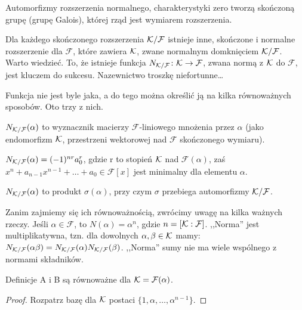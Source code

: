 Automorfizmy rozszerzenia normalnego, charakterystyki zero tworzą skończoną grupę (grupę Galois), której rząd jest wymiarem rozszerzenia.

Dla każdego skończonego rozszerzenia $\mathcal K/\mathcal F$ istnieje inne, skończone i normalne rozszerzenie dla $\mathcal F$, które zawiera $\mathcal K$, zwane {normalnym domknięciem} $\mathcal K/\mathcal F$.
Warto wiedzieć.
To, że istnieje funkcja  $N_{\mathcal K/\mathcal F} \colon \mathcal K \to \mathcal F$, zwana normą z $\mathcal K$ do $\mathcal F$, jest kluczem do sukcesu.
Nazewnictwo troszkę niefortunne\dots

Funkcja nie jest byle jaka, a do tego można określić ją na kilka równoważnych sposobów. Oto trzy z nich.

\begin{definicja}
	$N_{\mathcal K/ \mathcal F}(\alpha)$ to wyznacznik macierzy $\mathcal F$-liniowego mnożenia przez $\alpha$ (jako endomorfizm $\mathcal K$, przestrzeni wektorowej nad $\mathcal F$ skończonego wymiaru).
\end{definicja}

\begin{definicja}
	$N_{\mathcal K/\mathcal F}(\alpha) = (-1)^{nr} a_0^r$, gdzie r to stopień $\mathcal K$ nad $\mathcal F(\alpha)$, zaś $x^n + a_{n-1}x^{n-1} + \dots  + a_0 \in \mathcal F[x]$ jest minimalny dla elementu $\alpha$.
\end{definicja}

\begin{definicja} $N_{\mathcal K/\mathcal F}(\alpha)$ to produkt $\sigma(\alpha)$, przy czym $\sigma$ przebiega automorfizmy $\mathcal K / \mathcal F$.
\end{definicja}

Zanim zajmiemy się ich równoważnością, zwrócimy uwagę na kilka ważnych rzeczy.
Jeśli $\alpha \in \mathcal F$, to $N(\alpha) = \alpha^n$, gdzie $n = [\mathcal K : \mathcal F]$.
,,Norma'' jest multiplikatywna, tzn. dla dowolnych $\alpha, \beta \in \mathcal K$ mamy: $N_{\mathcal K / \mathcal F}(\alpha \beta) = N_{\mathcal K / \mathcal F}(\alpha) N_{\mathcal K / \mathcal F}(\beta)$.
,,Norma'' sumy nie ma wiele wspólnego z normami składników.

\begin{lemat}
	Definicje A i B są równoważne dla $\mathcal K = \mathcal F(\alpha)$.
\end{lemat}

\begin{proof}
	Rozpatrz bazę dla $\mathcal K$ postaci $\{1, \alpha, \dots, \alpha^{n-1}\}$.
\end{proof}

